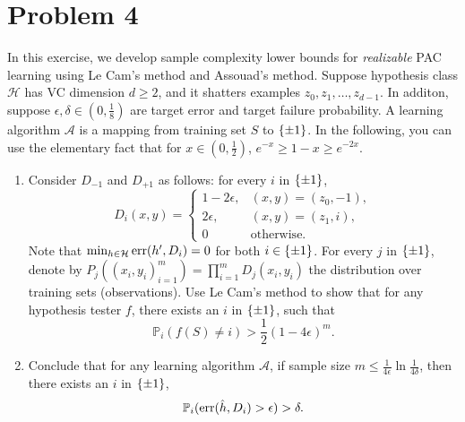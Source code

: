 \documentclass{article}
\DeclareMathOperator*{\err}{{\rm err}}
\DeclareMathOperator*{\U}{{\rm U}}
\newcommand{\PP}{\mathbb{P}} %
\newcommand{\Acal}{\mathcal{A}} %
\newcommand{\Hcal}{\mathcal{H}} %
\begin{document}
\section*{Problem 4}
In this exercise, we develop sample complexity lower bounds for {\em realizable} PAC learning using Le Cam's method and Assouad's method. Suppose hypothesis class $\Hcal$ has VC dimension $d \geq 2$, and it shatters examples $z_0, z_1, \ldots, z_{d-1}$. In additon, suppose $\epsilon, \delta \in (0,\frac18)$ are target error and target failure probability.
A learning algorithm $\Acal$ is a mapping from training set $S$ to $\cbr{\pm 1}$.
In the following, you can use the elementary fact that for $x \in (0,\frac12)$, $e^{-x} \geq 1-x \geq e^{-2x}$.


\begin{enumerate}
\item Consider $D_{-1}$ and $D_{+1}$ as follows: for every $i$ in $\cbr{\pm 1}$,
\[ D_{i}(x,y) = \begin{cases} 1-2\epsilon, & (x,y) = (z_0, -1), \\
                                2\epsilon, & (x,y) = (z_1, i), \\
                                0 & \text{otherwise.} \end{cases}  \]
Note that $\min_{h \in \Hcal} \err(h', D_i) = 0$ for both $i \in \cbr{\pm 1}$.
For every $j$ in $\cbr{\pm 1}$, denote by $P_{j}((x_i,y_i)_{i=1}^m) = \prod_{i=1}^m D_{j}(x_i, y_i)$ the distribution over training sets (observations).
Use Le Cam's method to show that for any hypothesis tester $f$, there exists an $i$
in $\cbr{\pm 1}$, such that
\[ \PP_i( f(S) \neq i ) > \frac12 (1-4\epsilon)^m. \]



\item Conclude that for any learning algorithm $\Acal$, if sample size $m \leq \frac{1}{4\epsilon}\ln\frac1{4\delta}$, then there exists an $i$ in $\cbr{\pm 1}$,
\[ \PP_i( \err(\hat{h}, D_i) > \epsilon) > \delta. \]


\end{enumerate}
\end{document}
